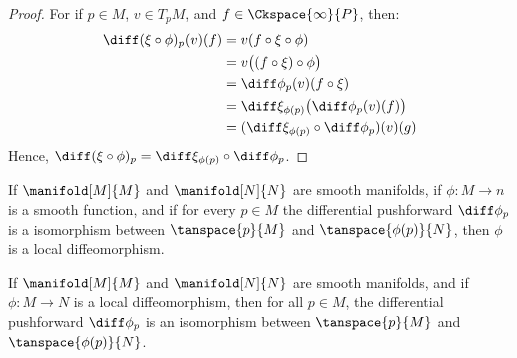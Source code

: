 \documentclass{article}                                                        %
\begin{document}
            \begin{proof}
                For if $p\in{M}$, $v\in{T}_{p}M$, and $f\in\Ckspace{\infty}{P}$,
                then:
                \begin{align}
                    \diff(\xi\circ\phi)_{p}(v)(f)
                    &=v(f\circ\xi\circ\phi)\\
                    &=v\big((f\circ\xi)\circ\phi\big)\\
                    &=\diff\phi_{p}(v)(f\circ\xi)\\
                    &=\diff\xi_{\phi(p)}\big(\diff\phi_{p}(v)(f)\big)\\
                    &=(\diff\xi_{\phi(p)}\circ\diff\phi_{p})(v)(g)
                \end{align}
                Hence,
                $\diff(\xi\circ\phi)_{p}=\diff\xi_{\phi(p)}\circ\diff\phi_{p}$.
            \end{proof}
            \begin{theorem}
                If $\manifold[M]{M}$ and $\manifold[N]{N}$ are smooth manifolds,
                if $\phi:M\rightarrow{n}$ is a smooth function, and if
                for every $p\in{M}$ the differential pushforward
                $\diff\phi_{p}$ is a isomorphism between $\tanspace{p}{M}$ and
                $\tanspace{\phi(p)}{N}$, then $\phi$ is a local diffeomorphism.
            \end{theorem}
            \begin{theorem}
                If $\manifold[M]{M}$ and $\manifold[N]{N}$ are smooth manifolds,
                and if $\phi:M\rightarrow{N}$ is a local diffeomorphism, then
                for all $p\in{M}$, the differential pushforward $\diff\phi_{p}$
                is an isomorphism between $\tanspace{p}{M}$ and
                $\tanspace{\phi(p)}{N}$.
            \end{theorem}
\end{document}

